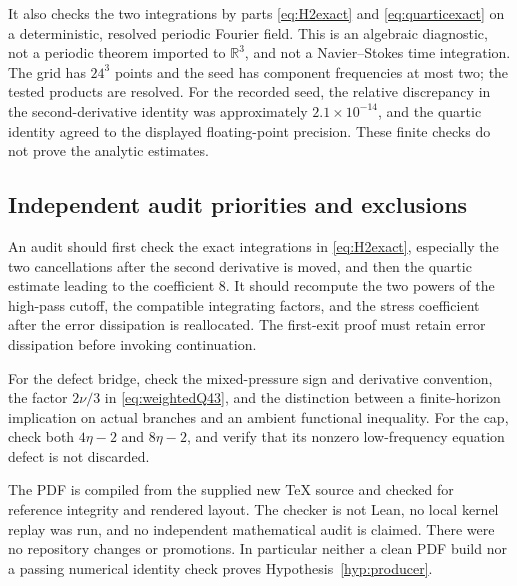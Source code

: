 \documentclass[11pt,a4paper]{article}
\theoremstyle{definition}\newtheorem{definition}[theorem]{Definition}
\theoremstyle{remark}\newtheorem{remark}[theorem]{Remark}
\newcommand{\R}{\mathbb R}
\numberwithin{equation}{section}
\begin{document}
It also checks the two integrations by parts \eqref{eq:H2exact} and \eqref{eq:quarticexact} on a deterministic, resolved periodic Fourier field. This is an algebraic diagnostic, not a periodic theorem imported to $\R^3$, and not a Navier--Stokes time integration. The grid has $24^3$ points and the seed has component frequencies at most two; the tested products are resolved. For the recorded seed, the relative discrepancy in the second-derivative identity was approximately $2.1\times10^{-14}$, and the quartic identity agreed to the displayed floating-point precision. These finite checks do not prove the analytic estimates.

\subsection{Independent audit priorities and exclusions}
An audit should first check the exact integrations in \eqref{eq:H2exact}, especially the two cancellations after the second derivative is moved, and then the quartic estimate leading to the coefficient $8$. It should recompute the two powers of the high-pass cutoff, the compatible integrating factors, and the stress coefficient after the error dissipation is reallocated. The first-exit proof must retain error dissipation before invoking continuation.

For the defect bridge, check the mixed-pressure sign and derivative convention, the factor $2\nu/3$ in \eqref{eq:weightedQ43}, and the distinction between a finite-horizon implication on actual branches and an ambient functional inequality. For the cap, check both $4\eta-2$ and $8\eta-2$, and verify that its nonzero low-frequency equation defect is not discarded.

The PDF is compiled from the supplied new TeX source and checked for reference integrity and rendered layout. The checker is not Lean, no local kernel replay was run, and no independent mathematical audit is claimed. There were no repository changes or promotions. In particular neither a clean PDF build nor a passing numerical identity check proves Hypothesis~\ref{hyp:producer}.
\end{document}
